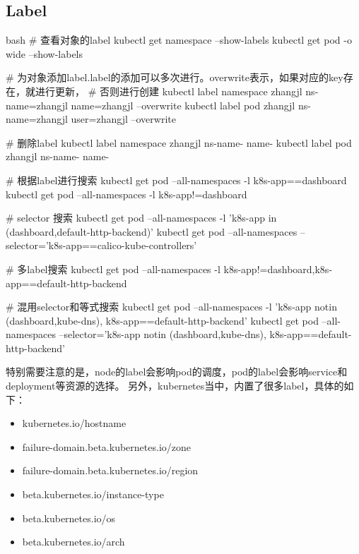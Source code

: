 \subsection{Label}
\begin{code-block}{bash}
# 查看对象的label
kubectl get namespace --show-labels
kubectl get pod -o wide --show-labels

# 为对象添加label.label的添加可以多次进行。overwrite表示，如果对应的key存在，就进行更新，
# 否则进行创建
kubectl label namespace zhangjl ns-name=zhangjl name=zhangjl --overwrite
kubectl label pod zhangjl ns-name=zhangjl user=zhangjl --overwrite

# 删除label
kubectl label namespace zhangjl ns-name- name-
kubectl label pod zhangjl ns-name- name-

# 根据label进行搜索
kubectl get pod --all-namespaces  -l k8s-app==dashboard
kubectl get pod --all-namespaces  -l k8s-app!=dashboard

# selector 搜索
kubectl get pod --all-namespaces  -l 'k8s-app in (dashboard,default-http-backend)'
kubectl get pod --all-namespaces --selector='k8s-app==calico-kube-controllers'

# 多label搜索
kubectl get pod --all-namespaces  -l k8s-app!=dashboard,k8s-app==default-http-backend

# 混用selector和等式搜索
kubectl get pod --all-namespaces  -l 'k8s-app notin (dashboard,kube-dns), k8s-app==default-http-backend'
kubectl get pod --all-namespaces  --selector='k8s-app notin (dashboard,kube-dns), k8s-app==default-http-backend'
\end{code-block}
特别需要注意的是，node的label会影响pod的调度，pod的label会影响service和deployment等资源的选择。
另外，kubernetes当中，内置了很多label，具体的如下：
\begin{itemize}
    \item kubernetes.io/hostname
    \item failure-domain.beta.kubernetes.io/zone
    \item failure-domain.beta.kubernetes.io/region
    \item beta.kubernetes.io/instance-type
    \item beta.kubernetes.io/os
    \item beta.kubernetes.io/arch
\end{itemize}

